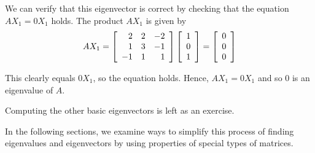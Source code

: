 \begin{solution}
We can verify that this eigenvector is correct by checking that the equation $AX_1 = 0 X_1$ holds.
The product $AX_1$ is given by
\begin{equation*}
AX_1=\left[
\begin{array}{rrr}
2 & 2 & -2 \\
1 & 3 & -1 \\
-1 & 1 & 1
\end{array}
\right]
\left[
\begin{array}{r}
1 \\
0 \\
1
\end{array}
\right]
=
\left[
\begin{array}{r}
0 \\
0 \\
0
\end{array}
\right]
\end{equation*}

This clearly equals $0X_1$, so the equation holds. Hence, $AX_1 = 0X_1$ and so $0$ is an eigenvalue of $A$.

Computing the other basic eigenvectors is left as an exercise. 
\end{solution}

In the following sections, we examine ways to simplify this process of finding eigenvalues and eigenvectors by using 
properties of special types of matrices.
